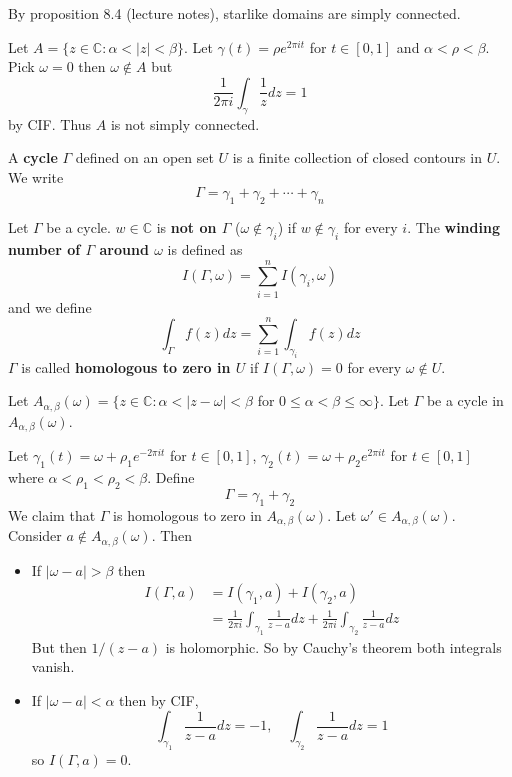 \begin{example}
	By proposition 8.4 (lecture notes), starlike domains are simply connected.
\end{example}

\begin{example}
	Let $A = \{ z \in \mathbb{C}: \alpha < |z| < \beta \}$. Let $\gamma(t) = \rho e^{2 \pi i t}$ for $t \in [0, 1]$ and $\alpha < \rho < \beta$. Pick $\omega = 0$ then $\omega 
	\notin A$ but
	\[
		\frac{1}{2 \pi i} \int_{\gamma} \frac{1}{z} dz = 1
	\]
	by CIF. Thus $A$ is not simply connected.
\end{example}

\begin{definition}
	A \textbf{cycle} $\Gamma$ defined on an open set $U$ is a finite collection of closed contours in $U$. We write
	\[
		\Gamma = \gamma_1 + \gamma_2 + \cdots + \gamma_n
	\]
\end{definition}

\begin{definition}
	Let $\Gamma$ be a cycle. $w \in \mathbb{C}$ is \textbf{not on $\Gamma$} ($\omega \notin \gamma_i$) if $w \notin \gamma_i$ for every $i$. The \textbf{winding number of $\Gamma$ around $\omega$} is defined as
	\[
		I(\Gamma, \omega) = \sum_{i = 1}^n I(\gamma_i, \omega)
	\]
	and we define
	\[
		\int_{\Gamma} f(z) dz = \sum_{i = 1}^n \int_{\gamma_i} f(z) dz
	\]
	$\Gamma$ is called \textbf{homologous to zero in $U$} if $I(\Gamma, \omega) = 0$ for every $\omega \notin U$.
\end{definition}

\begin{example}
	Let $A_{\alpha, \beta} (\omega) = \{ z \in \mathbb{C}: \alpha < |z - \omega| < \beta$ for $0 \le \alpha < \beta \le \infty \}$. Let $\Gamma$ be a cycle in $A_{\alpha, \beta} (\omega)$.

	Let $\gamma_1(t) = \omega + \rho_1 e^{-2 \pi i t}$ for $t \in [0, 1]$, $\gamma_2(t) = \omega + \rho_2 e^{2 \pi i t}$ for $t \in [0, 1]$ where $\alpha < \rho_1 < \rho_2 < \beta$. Define
	\[
		\Gamma = \gamma_1 + \gamma_2
	\]
	We claim that $\Gamma$ is homologous to zero in $A_{\alpha, \beta} (\omega)$. Let $\omega' \in A_{\alpha, \beta} (\omega)$. Consider $a \notin A_{\alpha, \beta} (\omega)$. Then
	\begin{itemize}
		\item If $|\omega - a| > \beta$ then
		\[
			\begin{aligned}
				I(\Gamma, a)
					& = I(\gamma_1, a) + I(\gamma_2, a) \\
					& = \frac{1}{2 \pi i} \int_{\gamma_1} \frac{1}{z - a} dz + \frac{1}{2 \pi i} \int_{\gamma_2} \frac{1}{z - a} dz
			\end{aligned}
		\]
		But then $1 / (z - a)$ is holomorphic. So by Cauchy's theorem both integrals vanish.
		\item If $|\omega - a| < \alpha$ then by CIF,
		\[
			\int_{\gamma_1} \frac{1}{z - a} dz = -1, \quad \int_{\gamma_2} \frac{1}{z - a} dz = 1
		\]
		so $I(\Gamma, a) = 0$.
	\end{itemize}
\end{example}

